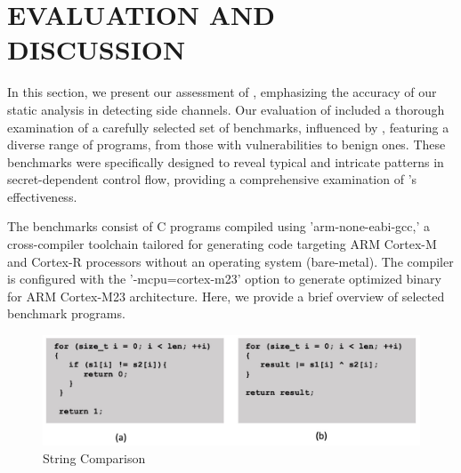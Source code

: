 \section{EVALUATION AND DISCUSSION}

In this section, we present our assessment of
\tool{}, emphasizing the accuracy of our static
analysis in detecting side channels. Our evaluation of
\tool{} included a thorough examination of a
carefully selected set of benchmarks, influenced by \cite{hans}, featuring
a diverse range of programs, from those with vulnerabilities to benign
ones. These benchmarks were specifically designed to reveal typical and
intricate patterns in secret-dependent control flow, providing a
comprehensive examination of \tool{}'s effectiveness. 

The benchmarks consist of C programs compiled using 'arm-none-eabi-gcc,' a
cross-compiler toolchain tailored for generating code targeting ARM
Cortex-M and Cortex-R processors without an operating system (bare-metal).
The compiler is configured with the '-mcpu=cortex-m23' option to generate
optimized binary for ARM Cortex-M23 architecture. Here, we provide a brief
overview of selected benchmark programs. 

 \begin{figure}
  \centering
  \includegraphics[width=\columnwidth]{figures/string.jpg}
  \caption{String Comparison}
  \label{fig:string}
\end{figure}


